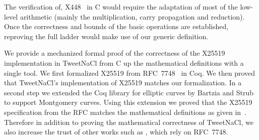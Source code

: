 The verification of, \eg X448~\cite{cryptoeprint:2015:625,rfc7748} in C would
require the adaptation of most of the low-level arithmetic (mainly the
multiplication, carry propagation and reduction).
Once the correctness and bounds of the basic operations are established,
reproving the full ladder would make use of our generic definition.

We provide a mechanized formal proof of the correctness of the X25519
implementation in TweetNaCl from C up the mathematical definitions with a single tool.
We first formalized X25519 from RFC~7748~\cite{rfc7748} in Coq.
We then proved that TweetNaCl's implementation of X25519 matches our formalization.
In a second step we extended the Coq library for elliptic curves \cite{BartziaS14}
by Bartzia and Strub to support Montgomery curves.
Using this extension we proved that the X25519 specification from the RFC matches the
mathematical definitions as given in~\cite[Sec.~2]{Ber06}.
Therefore in addition to proving the mathematical correctness of TweetNaCl,
we also increase the trust of other works such as
\cite{zinzindohoue2017hacl,Erbsen2016SystematicSO}, which rely on RFC~7748.
\vspace{-0.3cm}
